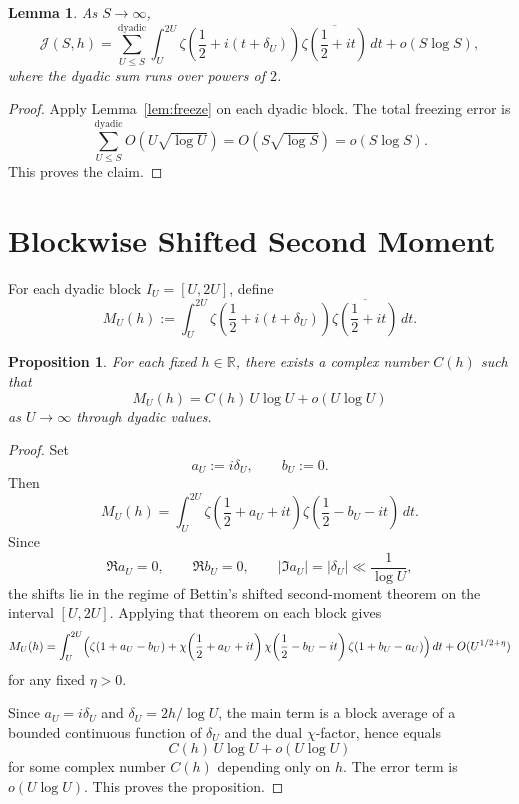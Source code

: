 \documentclass[11pt]{article}
\theoremstyle{plain}
\newtheorem{lemma}{Lemma}
\newtheorem{proposition}{Proposition}
\theoremstyle{definition}
\newcommand{\assign}{:=}
\begin{document}
\begin{lemma}
\label{lem:freeze-global}
As $S\to\infty$,
\[
\mathcal J(S,h)
=
\sum_{U\le S}^{\mathrm{dyadic}}
\int_U^{2U}
\zeta\!\left(\frac12+i(t+\delta_U)\right)\overline{\zeta\!\left(\frac12+it\right)}
\,dt
+
o(S\log S),
\]
where the dyadic sum runs over powers of $2$.
\end{lemma}

\begin{proof}
Apply Lemma~\ref{lem:freeze} on each dyadic block. The total freezing error is
\[
\sum_{U\le S}^{\mathrm{dyadic}} O\!\left(U\sqrt{\log U}\right)
=
O\!\left(S\sqrt{\log S}\right)
=
o(S\log S).
\]
This proves the claim.
\end{proof}

\section{Blockwise Shifted Second Moment}

For each dyadic block $I_U=[U,2U]$, define
\[
M_U(h)\assign
\int_U^{2U}
\zeta\!\left(\frac12+i(t+\delta_U)\right)\overline{\zeta\!\left(\frac12+it\right)}
\,dt.
\]

\begin{proposition}
\label{prop:block}
For each fixed $h\in\mathbb{R}$, there exists a complex number $C(h)$ such that
\[
M_U(h)=C(h)\,U\log U+o(U\log U)
\]
as $U\to\infty$ through dyadic values.
\end{proposition}

\begin{proof}
Set
\[
a_U\assign i\delta_U,
\qquad
b_U\assign 0.
\]
Then
\[
M_U(h)
=
\int_U^{2U}
\zeta\!\left(\frac12+a_U+it\right)\zeta\!\left(\frac12-b_U-it\right)\,dt.
\]
Since
\[
\Re a_U=0,\qquad \Re b_U=0,\qquad |\Im a_U|=|\delta_U|\ll \frac1{\log U},
\]
the shifts lie in the regime of Bettin's shifted second-moment theorem on the interval
$[U,2U]$. Applying that theorem on each block gives
\[
M_U(h)
=
\int_U^{2U}
\Bigl(
\zeta(1+a_U-b_U)
+
\chi\!\left(\frac12+a_U+it\right)\chi\!\left(\frac12-b_U-it\right)\zeta(1+b_U-a_U)
\Bigr)\,dt
+
O(U^{1/2+\eta})
\]
for any fixed $\eta>0$.

Since $a_U=i\delta_U$ and $\delta_U=2h/\log U$, the main term is a block average of a bounded
continuous function of $\delta_U$ and the dual $\chi$-factor, hence equals
\[
C(h)\,U\log U+o(U\log U)
\]
for some complex number $C(h)$ depending only on $h$.
The error term is $o(U\log U)$.
This proves the proposition.
\end{proof}
\end{document}
